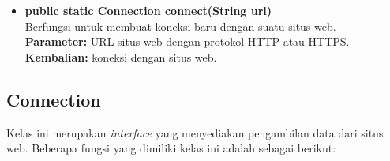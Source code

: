 \begin{itemize}
    \item \textbf{public static Connection connect(String url)}\\
    Berfungsi untuk membuat koneksi baru dengan suatu situs web.\\
    \textbf{Parameter:} URL situs web dengan protokol HTTP atau HTTPS.\\
    \textbf{Kembalian:} koneksi dengan situs web.
\end{itemize}

\subsection{Connection}
Kelas ini merupakan \textit{interface} yang menyediakan pengambilan data dari situs web. Beberapa
fungsi yang dimiliki kelas ini adalah sebagai berikut:

